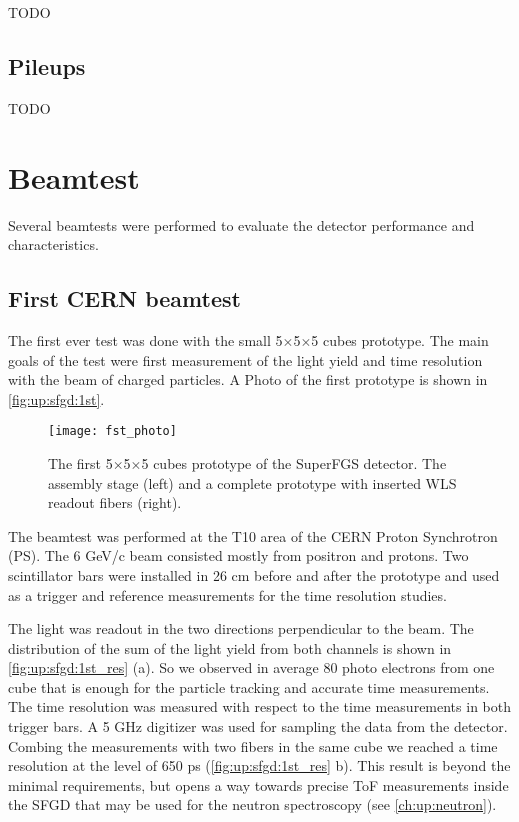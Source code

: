\documentclass[main.tex]{subfiles}
\begin{document}
TODO

\subsection{Pileups}

TODO




\section{Beamtest}
\label{sec:up:sfgd:beam}
Several beamtests were performed to evaluate the detector performance and characteristics.

\subsection{First CERN beamtest}
\label{sec:up:sfgd:beam1}
The first ever test was done with the small 5$\times$5$\times$5 cubes prototype. The main goals of the test were first measurement of the light yield and time resolution with the beam of charged particles. A Photo of the first prototype is shown in \autoref{fig:up:sfgd:1st}.

\begin{figure}[!ht]
	\centering
	\texttt{[image: fst\_photo]}
	\caption{The first 5$\times$5$\times$5 cubes prototype of the SuperFGS detector. The assembly stage (left) and a complete prototype with inserted WLS readout fibers (right).}
	\label{fig:up:sfgd:1st}
\end{figure}

The beamtest was performed at the T10 area of the CERN Proton Synchrotron (PS). The 6 GeV/c beam consisted mostly from positron and protons. Two scintillator bars were installed in 26 cm before and after the prototype and used as a trigger and reference measurements for the time resolution studies.

The light was readout in the two directions perpendicular to the beam. The distribution of the sum of the light yield from both channels is shown in \autoref{fig:up:sfgd:1st_res} (a). So we observed in average 80 photo electrons from one cube that is enough for the particle tracking and accurate time measurements. The time resolution was measured with respect to the time measurements in both trigger bars. A 5 GHz digitizer was used for sampling the data from the detector. Combing the measurements with two fibers in the same cube we reached a time resolution at the level of 650 ps (\autoref{fig:up:sfgd:1st_res} b). This result is beyond the minimal requirements, but opens a way towards precise ToF measurements inside the SFGD that may be used for the neutron spectroscopy (see \autoref{ch:up:neutron}).
\end{document}
